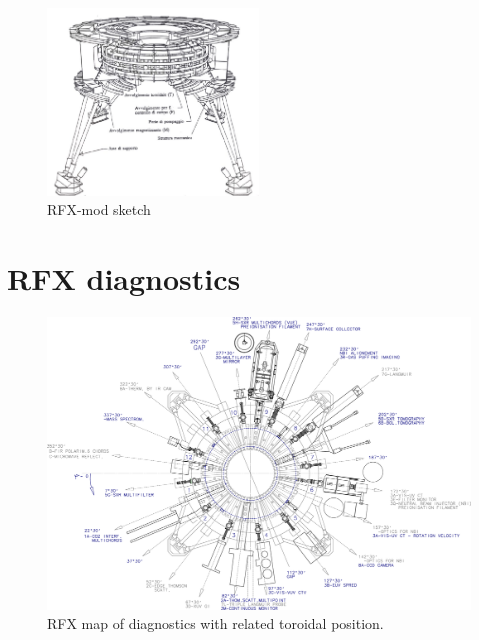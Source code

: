 \begin{figure}[ht!]
\includegraphics[width=0.5\textwidth]{img/rfx2}
\centering
\caption{RFX-mod sketch}
\label{rfx}
\end{figure}

\section{RFX diagnostics}

%
\begin{figure}[ht!]
\includegraphics[width=1\textwidth]{img/rfx/Layout_Diagnosiche_AA10005.eps} \centering
\caption{RFX map of diagnostics with related toroidal position.}
\label{rfx}
\end{figure}
%

